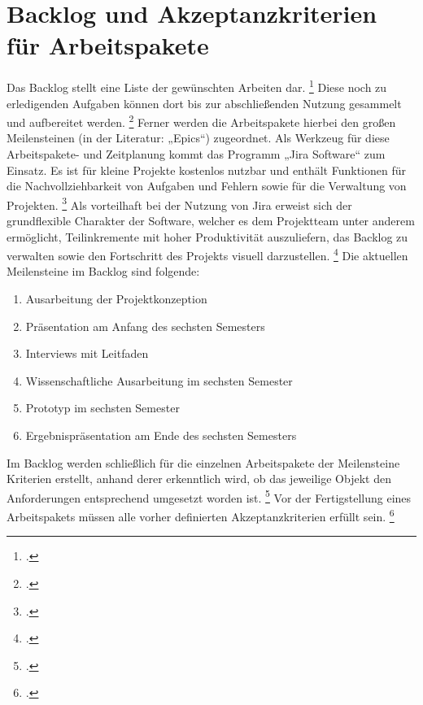\section{Backlog und Akzeptanzkriterien für Arbeitspakete}
Das Backlog stellt eine Liste der gewünschten Arbeiten dar.
\footcite[Vgl.][362]{kusay-merkleAgilesProjektmanagementIm2018}
Diese noch zu erledigenden Aufgaben können dort bis zur abschließenden Nutzung gesammelt und aufbereitet werden.
\footcite[Vgl.][362]{kusay-merkleAgilesProjektmanagementIm2018}
Ferner werden die Arbeitspakete hierbei den großen Meilensteinen (in der Literatur: „Epics“) zugeordnet.
Als Werkzeug für diese Arbeitspakete- und Zeitplanung kommt das Programm „Jira Software“ zum Einsatz.
Es ist für kleine Projekte kostenlos nutzbar und enthält Funktionen für die Nachvollziehbarkeit von Aufgaben
und Fehlern sowie für die Verwaltung von Projekten.
\footcite[Vgl.][3]{ortuMeasuringUnderstandingEffectiveness2015}
Als vorteilhaft bei der Nutzung von Jira erweist sich der grundflexible Charakter der Software, welcher
es dem Projektteam unter anderem ermöglicht, Teilinkremente mit hoher Produktivität auszuliefern, das Backlog zu verwalten
sowie den Fortschritt des Projekts visuell darzustellen.
\footcite[Vgl.][3]{ortuMeasuringUnderstandingEffectiveness2015}
Die aktuellen Meilensteine im Backlog sind folgende:
\begin{enumerate}
    \item Ausarbeitung der Projektkonzeption
    \item Präsentation am Anfang des sechsten Semesters
    \item Interviews mit Leitfaden
    \item Wissenschaftliche Ausarbeitung im sechsten Semester
    \item Prototyp im sechsten Semester
    \item Ergebnispräsentation am Ende des sechsten Semesters
\end{enumerate}
Im Backlog werden schließlich für die einzelnen Arbeitspakete der Meilensteine Kriterien erstellt, anhand derer
erkenntlich wird, ob das jeweilige Objekt den Anforderungen entsprechend umgesetzt worden ist.
\footcite[Vgl.][46]{kusay-merkleAgilesProjektmanagementIm2018}
Vor der Fertigstellung eines Arbeitspakets müssen alle vorher definierten Akzeptanzkriterien erfüllt sein.
\footcite[Vgl.][154]{kusterHandbuchProjektmanagementAgil2022}